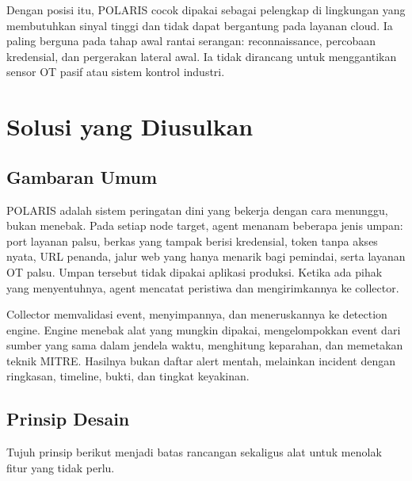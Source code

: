 \documentclass[12pt,a4paper]{article}
\begin{document}
Dengan posisi itu, POLARIS cocok dipakai sebagai pelengkap di lingkungan yang membutuhkan sinyal tinggi dan tidak dapat bergantung pada layanan cloud. Ia paling berguna pada tahap awal rantai serangan: reconnaissance, percobaan kredensial, dan pergerakan lateral awal. Ia tidak dirancang untuk menggantikan sensor OT pasif atau sistem kontrol industri.

\section{Solusi yang Diusulkan}

\subsection{Gambaran Umum}

POLARIS adalah sistem peringatan dini yang bekerja dengan cara menunggu, bukan menebak. Pada setiap node target, agent menanam beberapa jenis umpan: port layanan palsu, berkas yang tampak berisi kredensial, token tanpa akses nyata, URL penanda, jalur web yang hanya menarik bagi pemindai, serta layanan OT palsu. Umpan tersebut tidak dipakai aplikasi produksi. Ketika ada pihak yang menyentuhnya, agent mencatat peristiwa dan mengirimkannya ke collector.

Collector memvalidasi event, menyimpannya, dan meneruskannya ke detection engine. Engine menebak alat yang mungkin dipakai, mengelompokkan event dari sumber yang sama dalam jendela waktu, menghitung keparahan, dan memetakan teknik MITRE. Hasilnya bukan daftar alert mentah, melainkan incident dengan ringkasan, timeline, bukti, dan tingkat keyakinan.

\subsection{Prinsip Desain}

Tujuh prinsip berikut menjadi batas rancangan sekaligus alat untuk menolak fitur yang tidak perlu.
\end{document}
